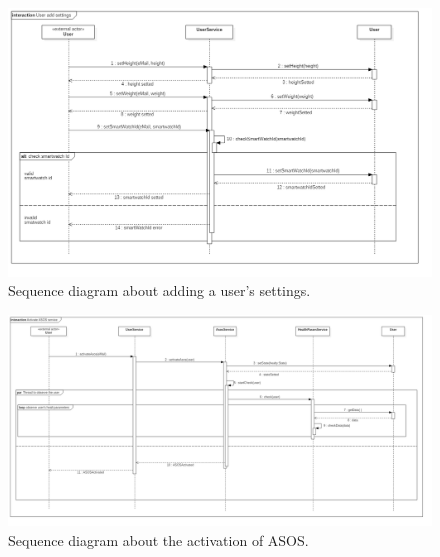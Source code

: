 \begin{figure}[h!]
	\includegraphics[width=1.0\textwidth]{./pictures/sequence_userSettings.png}\par
	\caption{Sequence diagram about adding a user's settings.}
\end{figure}
\FloatBarrier 

\begin{figure}[h!]
	\includegraphics[width=1.0\textwidth]{./pictures/sequence_activateAsos.png}\par
	\caption{Sequence diagram about the activation of ASOS.}
\end{figure}
\FloatBarrier 
